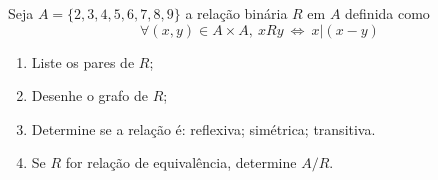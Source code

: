 \item
  Seja $A =\{2,3,4,5,6,7,8,9\}$  a relação binária $R$ em $A$ definida como
  \[ \forall (x,y) \in A\times A,\ xRy\ \Leftrightarrow\ x|(x-y)\]
  \begin{enumerate}
	\item Liste os pares de $R$;
	 \item Desenhe o grafo de $R$;
	\item  Determine se a relação é: reflexiva; simétrica; transitiva.
	  \item Se $R$ for relação de equivalência, determine $A/R$.
	  \end{enumerate}

